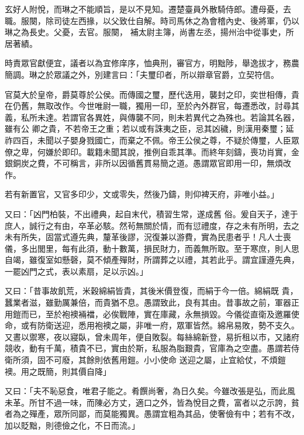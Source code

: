 \begin{pinyinscope}
 玄好人附悅，而琳之不能順旨，是以不見知。遷楚臺員外散騎侍郎。遭母憂，去職。服闋，除司徒左西掾，以父致仕自解。時司馬休之為會稽內史、後將軍，仍以琳之為長史。父憂，去官。服闋，
 補太尉主簿，尚書左丞，揚州治中從事史，所居著績。



 時責眾官獻便宜，議者以為宜修庠序，恤典刑，審官方，明黜陟，舉逸拔才，務農簡調。琳之於眾議之外，別建言曰：「夫璽印者，所以辯章官爵，立契符信。



 官莫大於皇帝，爵莫尊於公侯。而傳國之璽，歷代迭用，襲封之印，奕世相傳，貴在仍舊，無取改作。今世唯尉一職，獨用一印，至於內外群官，每遷悉改，討尋其義，私所未達。若謂官各異姓，與傳襲不同，則未若異代之為殊也。若論其名器，雖有公
 卿之貴，不若帝王之重；若以或有誅夷之臣，忌其凶穢，則漢用秦璽；延祚四百，未聞以子嬰身戮國亡，而棄之不佩。帝王公侯之尊，不疑於傳璽，人臣眾僚之卑，何嫌於即印。載籍未聞其說，推例自乖其準。而終年刻鑄，喪功肖實，金銀銅炭之費，不可稱言，非所以因循舊貫易簡之道。愚謂眾官即用一印，無煩改作。



 若有新置官，又官多印少，文或零失，然後乃鑄，則仰裨天府，非唯小益。」



 又曰：「凶門柏裝，不出禮典，起自末代，積習生常，遂成舊
 俗。爰自天子，達于庶人，誠行之有由，卒革必駭。然茍無關於情，而有愆禮度，存之未有所明，去之未有所失，固當式遵先典，釐革後謬，況復兼以游費，實為民患者乎！凡人士喪儀，多出閭里，每有此須，動十數萬，損民財力，而義無所取。至于寒庶，則人思自竭，雖復室如懸磬，莫不傾產殫財，所謂葬之以禮，其若此乎。謂宜謹遵先典，一罷凶門之式，表以素扇，足以示凶。」



 又曰：「昔事故飢荒，米穀綿絹皆貴，其後米價登復，而絹于今一倍。綿絹既
 貴，蠶業者滋，雖勤厲兼倍，而貴猶不息。愚謂致此，良有其由。昔事故之前，軍器正用鎧而已，至於袍襖裲襠，必俟戰陣，實在庫藏，永無損毀。今儀從直衛及邀羅使命，或有防衛送迎，悉用袍襖之屬，非唯一府，眾軍皆然。綿帛易敗，勢不支久。又晝以禦寒，夜以寢臥，曾未周年，便自敗裂。每絲綿新登，易折租以市，又諸府競收，動有千萬，積貴不已，實由於斯，私服為脂艱貴，官庫為之空盡。愚謂若侍衛所須，固不可廢，其餘則依舊用鎧。小小使命
 送迎之屬，止宜給仗，不煩鎧襖。用之既簡，則其價自降」



 又曰：「夫不恥惡食，唯君子能之。肴饌尚奢，為日久矣。今雖改張是弘，而此風未革。所甘不過一味，而陳必方丈，適口之外，皆為悅目之費，富者以之示誇，貧者為之殫產，眾所同鄙，而莫能獨異。愚謂宜粗為其品，使奢儉有中；若有不改，加以貶黜，則德儉之化，不日而流。」




\end{pinyinscope}
